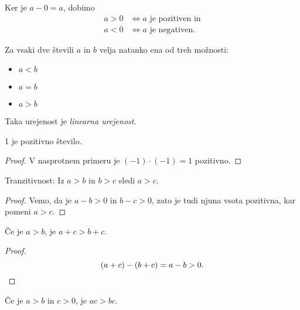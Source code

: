 \documentclass[12pt, a4paper]{article}
\begin{document}
\begin{opomba}
Ker je $a-0=a$, dobimo
\begin{align*}
a>0&\iff a\text{ je pozitiven in}
\\
a<0&\iff a\text{ je negativen.}
\end{align*}
\end{opomba}

\begin{posledica}
Za vsaki dve števili $a$ in $b$ velja natanko ena od treh možnosti:

\begin{multicols}{3}
\begin{center}
\begin{itemize}
\item $a<b$
\item $a=b$
\item $a>b$
\end{itemize}
\end{center}
\end{multicols}

Taka urejenost je \emph{linearna urejenost}.
\end{posledica}

\begin{posledica}
1 je pozitivno število.
\end{posledica}

\begin{proof}
V nasprotnem primeru je $(-1)\cdot(-1)=1$ pozitivno.
\end{proof}

\begin{opomba}
Tranzitivnost: Iz $a>b$ in $b>c$ sledi $a>c$.
\end{opomba}

\begin{proof}
Vemo, da je $a-b>0$ in $b-c>0$, zato je tudi njuna vsota pozitivna, kar pomeni $a>c$.
\end{proof}

\begin{opomba}
Če je $a>b$, je $a+c>b+c$.
\end{opomba}

\begin{proof}
\[
(a+c)-(b+c)=a-b>0.\qedhere
\]
\end{proof}

\begin{opomba}
Če je $a>b$ in $c>0$, je $ac>bc$.
\end{opomba}
\end{document}
